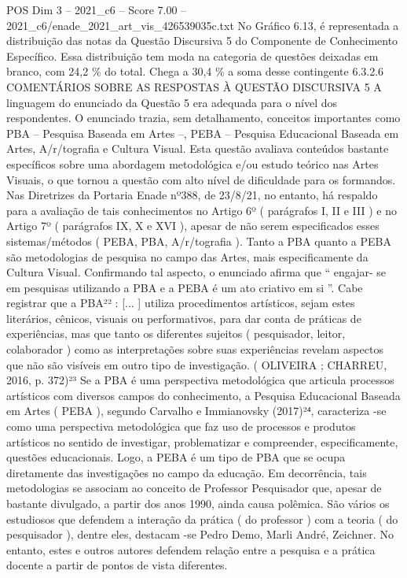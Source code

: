\begin{textsample}{POS Dim 3 – 2021\_c6 – Score 7.00 – 2021\_c6/enade\_2021\_art\_vis\_426539035c.txt}
No Gráfico 6.13, é representada a distribuição das notas da Questão Discursiva 5 do Componente de Conhecimento Específico.
Essa distribuição tem moda na categoria de questões deixadas em branco, com 24,2 \% do total.
Chega a 30,4 \% a soma desse contingente 6.3.2.6 COMENTÁRIOS SOBRE AS RESPOSTAS À QUESTÃO DISCURSIVA 5 A linguagem do enunciado da Questão 5 era adequada para o nível dos respondentes.
O enunciado trazia, sem detalhamento, conceitos importantes como PBA – Pesquisa Baseada em Artes –, PEBA – Pesquisa Educacional Baseada em Artes, A/r/tografia e Cultura Visual.
Esta questão avaliava conteúdos bastante específicos sobre uma abordagem metodológica e/ou estudo teórico nas Artes Visuais, o que tornou a questão com alto nível de dificuldade para os formandos.
Nas Diretrizes da Portaria Enade nº388, de 23/8/21, no entanto, há respaldo para a avaliação de tais conhecimentos no Artigo 6º ( parágrafos I, II e III ) e no Artigo 7º ( parágrafos IX, X e XVI ), apesar de não serem especificados esses sistemas/métodos ( PEBA, PBA, A/r/tografia ).
Tanto a PBA quanto a PEBA são metodologias de pesquisa no campo das Artes, mais especificamente da Cultura Visual.
Confirmando tal aspecto, o enunciado afirma que “ engajar- se em pesquisas utilizando a PBA e a PEBA é um ato criativo em si ”.
Cabe registrar que a PBA²² : [... ] utiliza procedimentos artísticos, sejam estes literários, cênicos, visuais ou performativos, para dar conta de práticas de experiências, mas que tanto os diferentes sujeitos ( pesquisador, leitor, colaborador ) como as interpretações sobre suas experiências revelam aspectos que não são visíveis em outro tipo de investigação. ( OLIVEIRA ; CHARREU, 2016, p. 372)²³ Se a PBA é uma perspectiva metodológica que articula processos artísticos com diversos campos do conhecimento, a Pesquisa Educacional Baseada em Artes ( PEBA ), segundo Carvalho e Immianovsky (2017)²⁴, caracteriza -se como uma perspectiva metodológica que faz uso de processos e produtos artísticos no sentido de investigar, problematizar e compreender, especificamente, questões educacionais.
Logo, a PEBA é um tipo de PBA que se ocupa diretamente das investigações no campo da educação.
Em decorrência, tais metodologias se associam ao conceito de Professor Pesquisador que, apesar de bastante divulgado, a partir dos anos 1990, ainda causa polêmica.
São vários os estudiosos que defendem a interação da prática ( do professor ) com a teoria ( do pesquisador ), dentre eles, destacam -se Pedro Demo, Marli André, Zeichner.
No entanto, estes e outros autores defendem relação entre a pesquisa e a prática docente a partir de pontos de vista diferentes.

\end{textsample}
